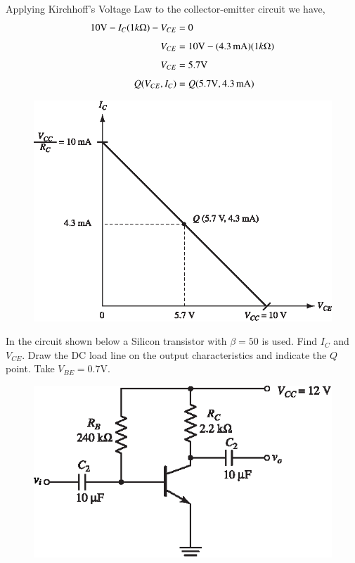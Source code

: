 \begin{solution}
Applying Kirchhoff's Voltage Law to the collector-emitter circuit we have,
\begin{align*}
10\text{V}-I_{C}(1 k\Omega)-V_{CE} &= 0\\[4pt]
V_{CE} &= 10\text{V}-(4.3\text{\,mA})(1 k\Omega)\\[4pt]
V_{CE} &= 5.7\text{V}\\[4pt]
Q(V_{CE},I_{C}) &= Q(5.7\text{V}, 4.3\text{\,mA})
\end{align*}
\begin{figure}[H]
\centering
\includegraphics{chap3/S3-EE-03-IN007.eps}
\end{figure}
\vskip -1cm
\end{solution}

\begin{example}\label{exam4.6}
In the circuit shown below a Silicon transistor with $\beta=50$ is used. Find $I_{C}$ and $V_{CE}$. Draw the DC load line on the output characteristics and indicate the $Q$ point. Take $V_{BE}=0.7\text{V}$.
\begin{figure}[H]
\centering
\includegraphics{chap3/S3-EE-03-IN008.eps}
\end{figure}
\end{example}

